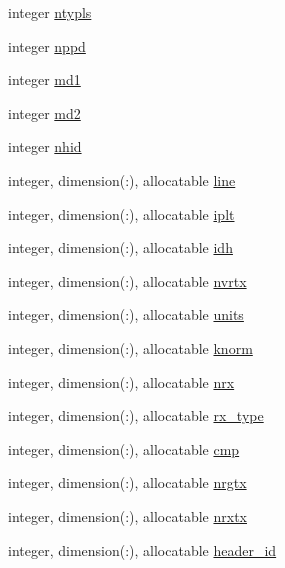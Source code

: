 \begin{DoxyCompactItemize}
\item 
integer \hyperlink{namespacelg__input__routines_ac26f639955df5fc922f956d58f7fe94a}{ntypls}
\item 
integer \hyperlink{namespacelg__input__routines_a702859cf9d00d80e7a499146a391d0eb}{nppd}
\item 
integer \hyperlink{namespacelg__input__routines_a17d7cadc2454b6016fb359a3a143f1e6}{md1}
\item 
integer \hyperlink{namespacelg__input__routines_ad088fcd28685af54ab4ccbdf35ebad22}{md2}
\item 
integer \hyperlink{namespacelg__input__routines_af75c2ef2a6d12db9bd287ce3495e8f48}{nhid}
\item 
integer, dimension(\+:), allocatable \hyperlink{namespacelg__input__routines_a6192486656a9e4b8f8a893cb39c1a3ef}{line}
\item 
integer, dimension(\+:), allocatable \hyperlink{namespacelg__input__routines_a7ac8905ebcdb83c2e30359605834b350}{iplt}
\item 
integer, dimension(\+:), allocatable \hyperlink{namespacelg__input__routines_a25ef99b6df9850605ad2562a20d87711}{idh}
\item 
integer, dimension(\+:), allocatable \hyperlink{namespacelg__input__routines_aaca8d700b89754dbbb181a41f27f68c3}{nvrtx}
\item 
integer, dimension(\+:), allocatable \hyperlink{namespacelg__input__routines_ab795991db3858f518c7ae1ef1106d716}{units}
\item 
integer, dimension(\+:), allocatable \hyperlink{namespacelg__input__routines_ac56a8d1d976273b4180c862633af12d6}{knorm}
\item 
integer, dimension(\+:), allocatable \hyperlink{namespacelg__input__routines_adf5b39741b7d138a3ecfb6657123a5ee}{nrx}
\item 
integer, dimension(\+:), allocatable \hyperlink{namespacelg__input__routines_afadcb9ad7dfccd7edb679d19fec0b5db}{rx\+\_\+type}
\item 
integer, dimension(\+:), allocatable \hyperlink{namespacelg__input__routines_ae700c1a68129dc3b61dd0eee2253b79f}{cmp}
\item 
integer, dimension(\+:), allocatable \hyperlink{namespacelg__input__routines_aa0b46c0970c520713d64c57e4ae00693}{nrgtx}
\item 
integer, dimension(\+:), allocatable \hyperlink{namespacelg__input__routines_a7b767c5d80ecdf07e162e0ca88f18f5a}{nrxtx}
\item 
integer, dimension(\+:), allocatable \hyperlink{namespacelg__input__routines_a84a9e4845e4cff7e15d920d545e920fe}{header\+\_\+id}

\end{DoxyCompactItemize}
